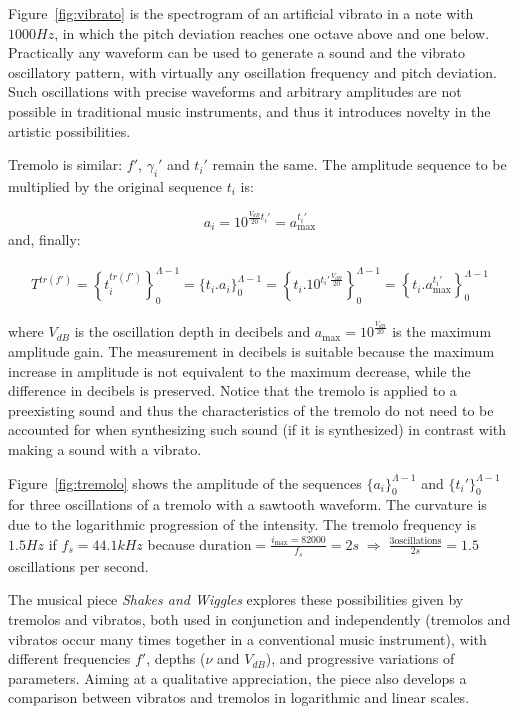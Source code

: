 Figure~\ref{fig:vibrato} is the spectrogram of an artificial vibrato in a note with $1000Hz$,
in which the pitch deviation reaches one octave above and one below.
Practically any waveform can be used to generate a sound and the vibrato oscillatory pattern, with virtually any oscillation frequency and pitch deviation.
Such oscillations with precise waveforms and arbitrary amplitudes are not possible in traditional music instruments, and thus it introduces novelty in the artistic possibilities.

Tremolo is similar: $f'$, $\gamma_i'$ and $t_i'$ remain the same.
The amplitude sequence to be multiplied by the original sequence $t_i$ is:

\begin{equation}\label{trA}
 a_i=10^{\frac{V_{dB}}{20}t_i' } = a_{\text{max}}^{t_i'}
\end{equation}
\noindent and, finally: 

\begin{equation}\label{trT}
\begin{split}
 T^{tr(f')}=\left \{ t_i^{tr(f')} \right \}_0^{\Lambda-1}=\{ t_i . a_i \}_0^{\Lambda-1}= \left \{t_i .10^{t_i' \frac{V_{dB}}{20}}    \right \}_0^{\Lambda-1}=\left\{t_i . a_{\text{max}}^{t_i'} \right\}_0^{\Lambda-1}
\end{split}
\end{equation}

\noindent where $V_{dB}$ is the oscillation depth in decibels and $a_{\text{max}}=10^{\frac{V_{dB}}{20}}$ is the maximum amplitude gain.
The measurement in decibels is suitable because the maximum increase in amplitude is not equivalent to the maximum decrease, while the difference in decibels is preserved.
Notice that the tremolo is applied to a preexisting sound and
thus the characteristics of the tremolo do not need to be accounted for
when synthesizing such sound (if it is synthesized)
in contrast with making a sound with a vibrato.

Figure~\ref{fig:tremolo} shows the amplitude of the sequences $\{a_i\}_0^{\Lambda-1}$ and $\{t_i'\}_0^{\Lambda-1}$ for three oscillations of a tremolo with a sawtooth waveform. The curvature is due to the logarithmic progression of the intensity. The tremolo frequency is $1.5Hz$ if $f_s=44.1kHz$ because $\text{duration} = \frac{i_{\text{max}}=82000}{f_s}= 2s \; \Rightarrow \; \frac{3\text{oscillations}}{2s}=1.5$ oscillations per second.

The musical piece \emph{Shakes and Wiggles} explores these possibilities given by tremolos and vibratos,
both used in conjunction and independently (tremolos and vibratos occur many times together in a conventional music instrument),
with different frequencies $f'$, depths ($\nu$ and $V_{dB}$),
and progressive variations of parameters.
Aiming at a qualitative appreciation,
the piece also develops a comparison between vibratos and tremolos in logarithmic and linear scales.~\cite{MASSA}

